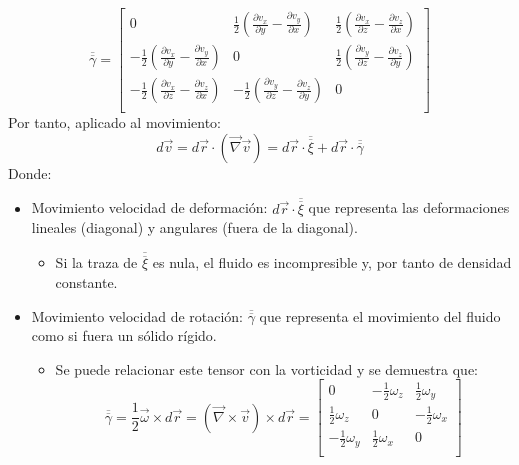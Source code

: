 \setlength{\arraycolsep}{1.5pt}
\renewcommand{\arraystretch}{1.5}
\[\overline{\overline{\gamma}}=\begin{bmatrix}
0 & \frac{1}{2}\left(\frac{\partial v_x}{\partial y}-\frac{\partial v_y}{\partial x}\right) & \frac{1}{2}\left(\frac{\partial v_x}{\partial z}-\frac{\partial v_z}{\partial x}\right) \\

	-\frac{1}{2}\left(\frac{\partial v_x}{\partial y}-\frac{\partial v_y}{\partial x}\right) & 0 & \frac{1}{2}\left(\frac{\partial v_y}{\partial z} -\frac{\partial v_z}{\partial y}\right) \\
	
	-\frac{1}{2}\left(\frac{\partial v_x}{\partial z}-\frac{\partial v_z}{\partial x}\right) & -\frac{1}{2}\left(\frac{\partial v_y}{\partial z} -\frac{\partial v_z}{\partial y}\right) & 0 \\
\end{bmatrix}\]
Por tanto, aplicado al movimiento:
\[d\vec{v}=d\vec{r}\cdot(\vec{\nabla}\vec{v})=d\vec{r}\cdot\overline{\overline{\xi}}+d\vec{r}\cdot\overline{\overline{\gamma}}\]
Donde:
\begin{itemize}
	\item Movimiento velocidad de deformación: $d\vec{r}\cdot\overline{\overline{\xi}}$ que representa las deformaciones lineales (diagonal) y angulares (fuera de la diagonal).
	\begin{itemize}
		\item Si la traza de $\overline{\overline{\xi}}$ es nula, el fluido es incompresible y, por tanto de densidad constante.
	\end{itemize}
	\item Movimiento velocidad de rotación: $\overline{\overline{\gamma}}$ que representa el movimiento del fluido como si fuera un sólido rígido.
	\begin{itemize}
		\item Se puede relacionar este tensor con la vorticidad y se demuestra que:
		\[\overline{\overline{\gamma}} =\frac{1}{2}\vec{\omega}\times d \vec{r}=\left(\vec{\nabla}\times\vec{v}\right)\times d \vec{r}=\begin{bmatrix}
			0 & -\frac{1}{2}\omega_z & \frac{1}{2}\omega_y \\
			\frac{1}{2}\omega_z & 0 & -\frac{1}{2}\omega_x\\	
			-\frac{1}{2}\omega_y & \frac{1}{2}\omega_x & 0 \\
		\end{bmatrix}\]
	\end{itemize}
\end{itemize}
